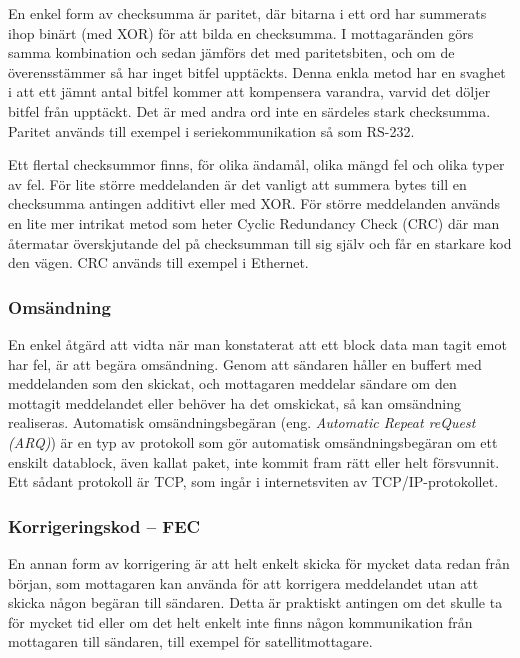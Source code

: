 En enkel form av checksumma är paritet, där bitarna i ett ord har summerats ihop
binärt (med XOR) för att bilda en checksumma. I mottagaränden görs samma
kombination och sedan jämförs det med paritetsbiten, och om de överensstämmer så
har inget bitfel upptäckts. Denna enkla metod har en svaghet i att ett jämnt
antal bitfel kommer att kompensera varandra, varvid det döljer bitfel från
upptäckt.
Det är med andra ord inte en särdeles stark checksumma.
Paritet används till exempel i seriekommunikation så som RS-232.

Ett flertal checksummor finns, för olika ändamål, olika mängd fel och olika
typer av fel. För lite större meddelanden är det vanligt att summera bytes
till en checksumma antingen additivt eller med XOR. För större meddelanden
används en lite mer intrikat metod som heter Cyclic Redundancy Check (CRC)
där man återmatar överskjutande del på checksumman till sig själv och får en
starkare kod den vägen. CRC används till exempel i Ethernet.

\subsubsection{Omsändning}

En enkel åtgärd att vidta när man konstaterat att ett block data man
tagit emot har fel, är att begära omsändning. Genom att sändaren håller en
buffert med meddelanden som den skickat, och mottagaren meddelar sändare om
den mottagit meddelandet eller behöver ha det omskickat, så kan omsändning
realiseras. Automatisk omsändningsbegäran (eng. \emph{Automatic Repeat reQuest
(ARQ)}) är en typ av protokoll som gör automatisk omsändningsbegäran om ett
enskilt datablock, även kallat paket, inte kommit fram rätt eller helt
försvunnit.
Ett sådant protokoll är TCP, som ingår i internetsviten av TCP/IP-protokollet.

\subsubsection{Korrigeringskod -- FEC}

En annan form av korrigering är att helt enkelt skicka för mycket data redan
från början, som mottagaren kan använda för att korrigera meddelandet utan att
skicka någon begäran till sändaren. Detta är praktiskt antingen om det skulle
ta för mycket tid eller om det helt enkelt inte finns någon kommunikation från
mottagaren till sändaren, till exempel för satellitmottagare.

